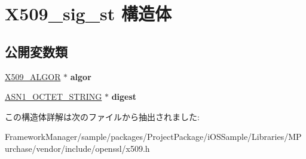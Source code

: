 \hypertarget{struct_x509__sig__st}{}\section{X509\+\_\+sig\+\_\+st 構造体}
\label{struct_x509__sig__st}
\subsection*{公開変数類}
\begin{DoxyCompactItemize}
\item 
\hypertarget{struct_x509__sig__st_a40608d2e687f0fd15132db525c18db60}{}\hyperlink{struct_x509__algor__st}{X509\+\_\+\+A\+L\+G\+O\+R} $\ast$ {\bfseries algor}\label{struct_x509__sig__st_a40608d2e687f0fd15132db525c18db60}

\item 
\hypertarget{struct_x509__sig__st_aef06b1dae888d04a2cdf2f85208d0ba2}{}\hyperlink{structasn1__string__st}{A\+S\+N1\+\_\+\+O\+C\+T\+E\+T\+\_\+\+S\+T\+R\+I\+N\+G} $\ast$ {\bfseries digest}\label{struct_x509__sig__st_aef06b1dae888d04a2cdf2f85208d0ba2}

\end{DoxyCompactItemize}


この構造体詳解は次のファイルから抽出されました\+:\begin{DoxyCompactItemize}
\item 
Framework\+Manager/sample/packages/\+Project\+Package/i\+O\+S\+Sample/\+Libraries/\+M\+Purchase/vendor/include/openssl/x509.\+h\end{DoxyCompactItemize}
